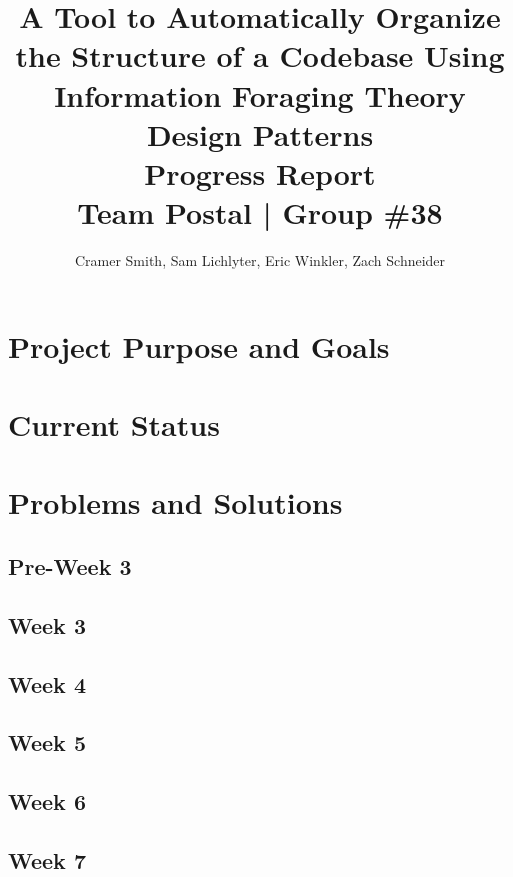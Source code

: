\documentclass[letterpaper,10pt,titlepage,draftclsnofoot,onecolumn,onesided] {IEEEtran}
\def\doctitle{A Tool to Automatically Organize the Structure of a Codebase Using Information Foraging Theory Design Patterns}
\def\doctype{Progress Report}
\def\team{Team Postal | Group \#38}
\begin{document}
\title{\Huge{\bfseries{\textsf{\doctitle}}}\\\textsf{\Large{\doctype}}\\\textsf{\large{\team}}}
\author{Cramer Smith, Sam Lichlyter, Eric Winkler, Zach Schneider}

\maketitle
\vfill

\vfill

\pagebreak

\tableofcontents

\pagebreak


\pagebreak

\section{Project Purpose and Goals}

\section{Current Status}

\section{Problems and Solutions}
	\subsection{Pre-Week 3}

	\subsection{Week 3}

	\subsection{Week 4}

	\subsection{Week 5}

	\subsection{Week 6}

	\subsection{Week 7}
\end{document}
